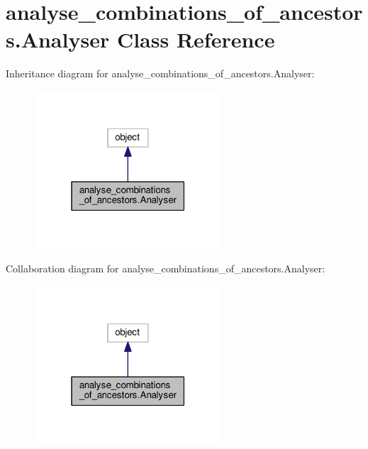 \hypertarget{classanalyse__combinations__of__ancestors_1_1Analyser}{}\section{analyse\+\_\+combinations\+\_\+of\+\_\+ancestors.\+Analyser Class Reference}
\label{classanalyse__combinations__of__ancestors_1_1Analyser}


Inheritance diagram for analyse\+\_\+combinations\+\_\+of\+\_\+ancestors.\+Analyser\+:\nopagebreak
\begin{figure}[H]
\begin{center}
\leavevmode
\includegraphics[width=199pt]{classanalyse__combinations__of__ancestors_1_1Analyser__inherit__graph}
\end{center}
\end{figure}


Collaboration diagram for analyse\+\_\+combinations\+\_\+of\+\_\+ancestors.\+Analyser\+:\nopagebreak
\begin{figure}[H]
\begin{center}
\leavevmode
\includegraphics[width=199pt]{classanalyse__combinations__of__ancestors_1_1Analyser__coll__graph}
\end{center}
\end{figure}
